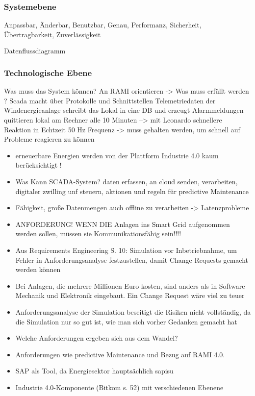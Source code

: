 \subsubsection{Systemebene}

Anpassbar, Änderbar, Benutzbar, Genau, Performanz, Sicherheit, Übertragbarkeit, Zuverlässigkeit

Datenflussdiagramm
\subsubsection{Technologische Ebene}





Was muss das System können? An RAMI orientieren -> Was muss erfüllt werden ?
Scada macht über Protokolle und Schnittstellen Telemetriedaten der Windenergieanlage
schreibt das Lokal in eine DB und erzeugt Alarmmeldungen
quittieren lokal am Rechner
alle 10 Minuten --> mit Leonardo schnellere Reaktion in Echtzeit
50 Hz Frequenz -> muss gehalten werden, um schnell auf Probleme reagieren zu können


\begin{itemize}
  \item erneuerbare Energien werden von der Plattform Industrie 4.0 kaum berücksichtigt !
  \item Was Kann SCADA-System? daten erfassen, an cloud senden, verarbeiten, digitaler zwilling unf steuern, aktionen und regeln für predictive Maintenance
  \item Fähigkeit, große Datenmengen auch offline zu verarbeiten -> Latenzprobleme
  \item ANFORDERUNG! WENN DIE Anlagen ins Smart Grid aufgenommen werden sollen, müssen sie Kommunikationsfähig sein!!!!
  \item Aus Requirements Engineering S. 10: Simulation vor Inbetriebnahme, um Fehler in Anforderungsanalyse festzustellen, damit Change Requests gemacht werden können
  \item Bei Anlagen, die mehrere Millionen Euro kosten, sind anders als in Software Mechanik und Elektronik eingebaut. Ein Change Request wäre viel zu teuer
  \item Anforderungsanalyse der Simulation beseitigt die Risiken nicht vollständig, da die Simulation nur so gut ist, wie man sich vorher Gedanken gemacht hat
  \item Welche Anforderungen ergeben sich aus dem Wandel?
  \item Anforderungen wie predictive Maintenance und Bezug auf RAMI 4.0.
  \item SAP als Tool, da Energiesektor hauptsächlich \acf{sapisu}
  \item Industrie 4.0-Komponente (Bitkom s. 52) mit verschiedenen Ebenene
\end{itemize}

